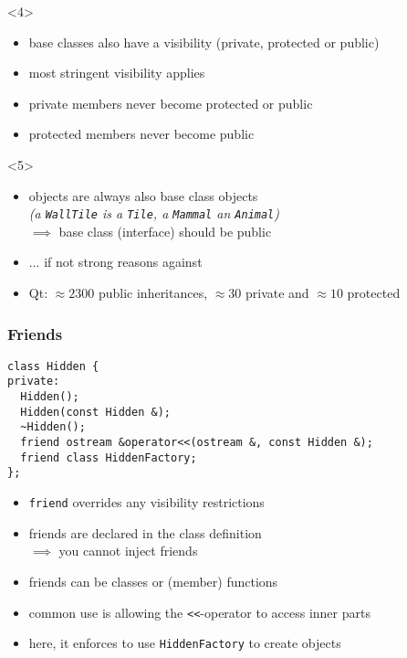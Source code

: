 \documentclass{slides}
\begin{document}
\begin{frame}[fragile]
  \begin{onlyenv}<4>
    \begin{itemize}
    \item base classes also have a visibility (private, protected or public)
    \item most stringent visibility applies
    \item private members never become protected or public
    \item protected members never become public
    \end{itemize}
  \end{onlyenv}

  \begin{onlyenv}<5>
    \begin{itemize}
    \item objects are always also base class objects\\
      \emph{(a \lstinline!WallTile! is a \lstinline!Tile!, a
      \lstinline!Mammal! an \lstinline!Animal!)}\\
      $\implies$ \alert{base class (interface) should be public}
    \item ... if not strong reasons against
    \item Qt: $\approx 2300$ public inheritances, $\approx 30$ private
      and $\approx 10$ protected
    \end{itemize}
  \end{onlyenv}
\end{frame}

\begin{frame}[fragile]
  \frametitle{Friends}

\begin{lstlisting}[emph={friend}]
class Hidden {
private:
  Hidden();
  Hidden(const Hidden &);
  ~Hidden();
  friend ostream &operator<<(ostream &, const Hidden &);
  friend class HiddenFactory;
};
\end{lstlisting}
  \begin{itemize}
  \item \lstinline[style=inline]!friend! overrides any visibility restrictions
  \item friends are declared in the class definition\\
    $\implies$ you cannot inject friends
  \item friends can be classes or (member) functions
  \item common use is allowing the \lstinline[style=inline]!<<!-operator to access inner parts
  \item here, it enforces to use \lstinline[style=inline]!HiddenFactory! to create objects
  \end{itemize}
\end{frame}
\end{document}
